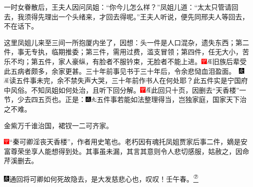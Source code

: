 一时女眷散后，王夫人因问凤姐：``你今儿怎么样？''凤姐儿道：``太太只管请回去，我须得先理出一个头绪来，才回去得呢。''王夫人听说，便先同邢夫人等回去，不在话下。

这里凤姐儿来至三间一所抱厦内坐了，因想：头一件是人口混杂，遗失东西；第二件，事无专执，临期推委；第三件，需用过费，滥支冒领；第四件，任无大小，苦乐不均；第五件，家人豪纵，有脸者不服钤束，无脸者不能上进。{\includegraphics[width=3mm]{../Images/00002}\includegraphics[width=3mm]{../Images/00010}\footnotesize \kaishu 旧族后辈受此五病者颇多，余家更甚。三十年前事见书于三十年后，令余悲恸血泪盈面。　\includegraphics[width=3mm]{../Images/00004}\includegraphics[width=3mm]{../Images/00010}\footnotesize \kaishu 读五件事未完，余不禁失声大哭，三十年前作书人在何处耶？}此五件实是宁国府中风俗。不知凤姐如何处治，且听下回分解。{\includegraphics[width=3mm]{../Images/00002}\includegraphics[width=3mm]{../Images/00010}\footnotesize \kaishu 此回只十页，因删去``天香楼''一节，少去四五页也。}正是：{\includegraphics[width=3mm]{../Images/00005}\includegraphics[width=3mm]{../Images/00012}\footnotesize \kaishu 五件事若能如法整理得当，岂独家庭，国家天下治之不难。}

金紫万千谁治国，裙钗一二可齐家。

{\includegraphics[width=3mm]{../Images/00002}``秦可卿淫丧天香楼''，作者用史笔也。老朽因有魂托凤姐贾家后事二件，嫡是安富尊荣坐享人能想得到处。其事虽未漏，其言其意则令人悲切感服，姑赦之，因命芹溪删去。}

{\includegraphics[width=3mm]{../Images/00004}通回将可卿如何死故隐去，是大发慈悲心也，叹叹！壬午春。}\href{../Text/part0017_split_000.html\#lnkback_7_a}{\textsuperscript{⑦}}

